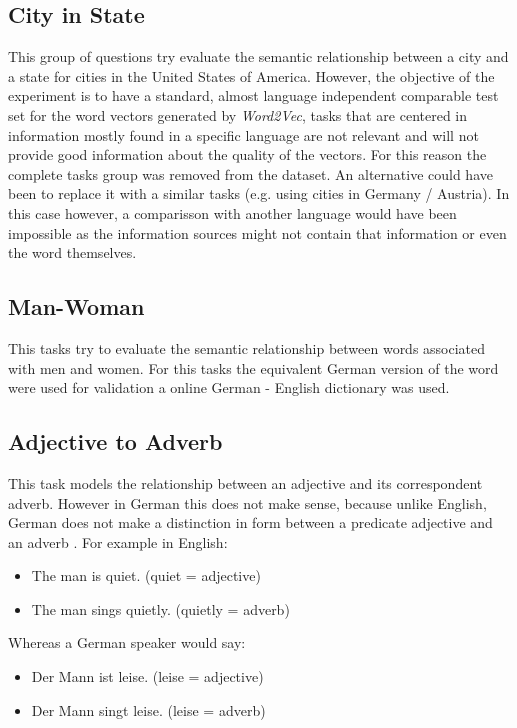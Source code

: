 \subsection{City in State}
\label{sec:sub_sec_city_in_state}
This group of questions try evaluate the semantic relationship between a city
and a state for cities in the United States of America.  However, the
objective of the experiment is to have a standard,  almost
language independent comparable test set for the word vectors generated by \textit{Word2Vec}, tasks that
are centered in information mostly found in a specific language are not relevant and
will not provide good information about the quality of the vectors. For this
reason the complete tasks group was  removed from the dataset. An alternative could have been to replace it with a similar
tasks (e.g. using cities in Germany / Austria). In this case however,  a
comparisson with another language would have been impossible as the
information sources might not contain that information or even the word
themselves.

\subsection{Man-Woman}
\label{sec:sub_sec_man_woman}
This tasks try to evaluate the semantic relationship between words associated
with men and women. For this tasks the equivalent German version of the word
were used for validation a  online German - English dictionary was used.

\subsection{Adjective to Adverb}
\label{sec:sub_sec_adjetive_adverb}
This task models the relationship between an adjective and its correspondent
adverb. However in German this does not make sense, because unlike English,
German does not make a distinction in form between a predicate adjective and
an adverb \cite{durrell2011hammer}. For example in English:

\begin{itemize}
\item The man is quiet. (quiet = adjective)
\item The man sings quietly. (quietly = adverb)
\end{itemize}

Whereas a German speaker would say:

\begin{itemize}
\item Der Mann ist leise. (leise = adjective)
\item Der Mann singt leise. (leise = adverb)
\end{itemize}


